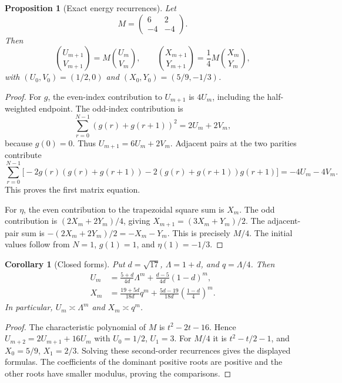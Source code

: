 \documentclass[11pt,a4paper,oneside,openany]{book}
\numberwithin{equation}{chapter}
\newtheorem{proposition}[theorem]{Proposition}
\newtheorem{corollary}[theorem]{Corollary}
\theoremstyle{definition}
\theoremstyle{remark}
\begin{document}
\begin{proposition}[Exact energy recurrences]
\label{bc:prop:energies}
Let
\begin{equation}
 M=\begin{pmatrix}6&2\\-4&-4\end{pmatrix}.
 \label{bc:eq:M}
\end{equation}
Then
\begin{equation}
 \binom{U_{m+1}}{V_{m+1}}=M\binom{U_m}{V_m},\qquad
 \binom{X_{m+1}}{Y_{m+1}}=\frac14M\binom{X_m}{Y_m},
 \label{bc:eq:energy-matrices}
\end{equation}
with $(U_0,V_0)=(1/2,0)$ and $(X_0,Y_0)=(5/9,-1/3)$.
\end{proposition}
\begin{proof}
For $g$, the even-index contribution to $U_{m+1}$ is $4U_m$, including the
half-weighted endpoint. The odd-index contribution is
\[
 \sum_{r=0}^{N-1}(g(r)+g(r+1))^2=2U_m+2V_m,
\]
because $g(0)=0$. Thus $U_{m+1}=6U_m+2V_m$. Adjacent pairs at the two parities
contribute
\[
 \sum_{r=0}^{N-1}\bigl[-2g(r)(g(r)+g(r+1))
       -2(g(r)+g(r+1))g(r+1)\bigr]
 =-4U_m-4V_m.
\]
This proves the first matrix equation.

For $\eta$, the even contribution to the trapezoidal square sum is $X_m$.
The odd contribution is $(2X_m+2Y_m)/4$, giving
$X_{m+1}=(3X_m+Y_m)/2$. The adjacent-pair sum is
$-(2X_m+2Y_m)/2=-X_m-Y_m$. This is precisely $M/4$.
The initial values follow from $N=1$, $g(1)=1$, and $\eta(1)=-1/3$.
\end{proof}

\begin{corollary}[Closed forms]
\label{bc:cor:energy-closed}
Put $d=\sqrt{17}$, $\Lambda=1+d$, and $q=\Lambda/4$. Then
\begin{align}
 U_m&=\frac{5+d}{4d}\Lambda^m
      +\frac{d-5}{4d}(1-d)^m,\label{bc:eq:U-closed}\\
 X_m&=\frac{19+5d}{18d}q^m
      +\frac{5d-19}{18d}\left(\frac{1-d}{4}\right)^m.
 \label{bc:eq:X-closed}
\end{align}
In particular, $U_m\asymp\Lambda^m$ and $X_m\asymp q^m$.
\end{corollary}
\begin{proof}
The characteristic polynomial of $M$ is $t^2-2t-16$. Hence
$U_{m+2}=2U_{m+1}+16U_m$ with $U_0=1/2$, $U_1=3$.
For $M/4$ it is $t^2-t/2-1$, and $X_0=5/9$, $X_1=2/3$.
Solving these second-order recurrences gives the displayed formulas. The
coefficients of the dominant positive roots are positive and the other roots
have smaller modulus, proving the comparisons.
\end{proof}
\end{document}
